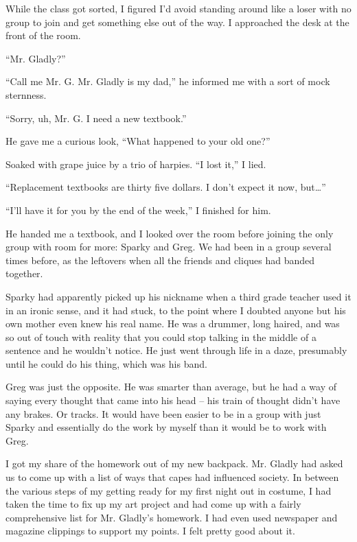 While the class got sorted, I figured I'd avoid standing around like a loser with no group to join and get something else out of the way. I approached the desk at the front of the room.



``Mr. Gladly?''



``Call me Mr. G.  Mr. Gladly is my dad,'' he informed me with a sort of mock sternness.



``Sorry, uh, Mr. G.  I need a new textbook.''



He gave me a curious look, ``What happened to your old one?''



Soaked with grape juice by a trio of harpies.  ``I lost it,'' I lied.



``Replacement textbooks are thirty five dollars.  I don't expect it now, but\ldots''



``I'll have it for you by the end of the week,'' I finished for him.



He handed me a textbook, and I looked over the room before joining the only group with room for more: Sparky and Greg.  We had been in a group several times before, as the leftovers when all the friends and cliques had banded together.



Sparky had apparently picked up his nickname when a third grade teacher used it in an ironic sense, and it had stuck, to the point where I doubted anyone but his own mother even knew his real name.  He was a drummer, long haired, and was so out of touch with reality that you could stop talking in the middle of a sentence and he wouldn't notice.  He just went through life in a daze, presumably until he could do his thing, which was his band.



Greg was just the opposite.  He was smarter than average, but he had a way of saying every thought that came into his head – his train of thought didn't have any brakes.  Or tracks.  It would have been easier to be in a group with just Sparky and essentially do the work by myself than it would be to work with Greg.



I got my share of the homework out of my new backpack.  Mr. Gladly had asked us to come up with a list of ways that capes had influenced society.  In between the various steps of my getting ready for my first night out in costume, I had taken the time to fix up my art project and had come up with a fairly comprehensive list for Mr. Gladly's homework.  I had even used newspaper and magazine clippings to support my points.  I felt pretty good about it.



